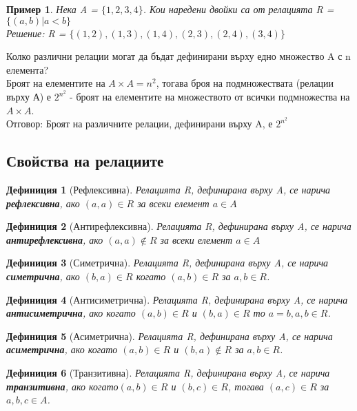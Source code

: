 \documentclass[fleqn, 12pt]{article}
\newtheorem{example}{Пример}[subsection]
\newtheorem{definition}{Дефиниция}[subsection]
\begin{document}
\begin{example}
Нека A = $\{1, 2, 3, 4\}$. Кои наредени двойки са от релацията R = $\{(a, b) | a < b\}$ \\
Решение: R =  $\{(1, 2), (1, 3), (1, 4), (2, 3), (2, 4), (3, 4) \}$
\end{example}
Колко различни релации могат да бъдат дефинирани върху едно множество A с n елемента? \\
Броят на елементите на $A \times A = n^2$, тогава броя на подмножествата (релации върху А) е $2^{n^2}$ - броят на елементите на множеството от всички подмножества на $A \times A$.\\
Отговор: Броят на различните релации, дефинирани върху A, е $2^{n^2}$

\subsection{Свойства на релациите}
 
\begin{definition}[Рефлексивна]
Релацията R, дефинирана върху A, се нарича \textbf{рефлексивна}, ако $(a, a) \in R $ за всеки елемент $a \in A$
\end{definition}

\begin{definition}[Антирефлексивна]
Релацията R, дефинирана върху A, се нарича \textbf{антирефлексивна}, ако $(a, a) \notin R $ за всеки елемент $a \in A$
\end{definition}

\begin{definition}[Симетрична]
Релацията R, дефинирана върху A, се нарича \textbf{симетрична}, ако $(b, a) \in R$ когато $(a, b) \in R $ за $a, b \in R$. 
\end{definition}

\begin{definition}[Антисиметрична]
Релацията R, дефинирана върху A, се нарича \textbf{антисиметрична}, ако когато $(a, b) \in R $ и $(b, a) \in R$ то $a = b, a,b \in R$. 
\end{definition}

\begin{definition}[Асиметрична]
Релацията R, дефинирана върху A, се нарича \textbf{асиметрична}, ако когато $(a, b) \in R $ и $(b, a) \notin R$ за $a,b \in R$. 
\end{definition}

\begin{definition}[Транзитивна]
Релацията R, дефинирана върху A, се нарича \textbf{транзитивна}, ако когато$(a, b)\in R$ и $(b,c) \in R$, тогава $(a, c)\in R$ за $a, b, c \in A$. 
\end{definition}
\end{document}
